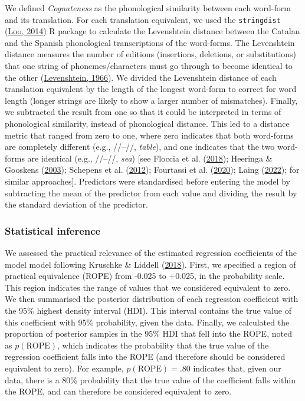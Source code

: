 \documentclass[
]{article}
\begin{document}
We defined \emph{Cognateness} as the phonological similarity between
each word-form and its translation. For each translation equivalent, we
used the \texttt{stringdist}
(\protect\hyperlink{ref-vanderloo2014stringdist}{Loo, 2014}) R package
to calculate the Levenshtein distance between the Catalan and the
Spanish phonological transcriptions of the word-forms. The Levenshtein
distance measures the number of editions (insertions, deletions, or
substitutions) that one string of phonemes/characters must go through to
become identical to the other
(\protect\hyperlink{ref-levenshtein1966binary}{Levenshtein, 1966}). We
divided the Levenshtein distance of each translation equivalent by the
length of the longest word-form to correct for word length (longer
strings are likely to show a larger number of mismatches). Finally, we
subtracted the result from one so that it could be interpreted in terms
of phonological similarity, instead of phonological distance. This led
to a distance metric that ranged from zero to one, where zero indicates
that both word-forms are completely different (e.g.,
//--//, \emph{table}), and one
indicates that the two word-forms are identical (e.g.,
//--//, \emph{sea}) {[}see Floccia et al.
(\protect\hyperlink{ref-floccia2018introduction}{2018}); Heeringa \&
Gooskens (\protect\hyperlink{ref-heeringa2003norwegian}{2003}); Schepens
et al. (\protect\hyperlink{ref-schepens2012distributions}{2012});
Fourtassi et al. (\protect\hyperlink{ref-fourtassi2020growth}{2020});
Laing (\protect\hyperlink{ref-laing2022phonological}{2022}); for similar
approaches{]}. Predictors were standardised before entering the model by
subtracting the mean of the predictor from each value and dividing the
result by the standard deviation of the predictor.

\hypertarget{statistical-inference}{%
\subsubsection{Statistical inference}\label{statistical-inference}}

We assessed the practical relevance of the estimated regression
coefficients of the model model following Kruschke \& Liddell
(\protect\hyperlink{ref-kruschke2018bayesian}{2018}). First, we
specified a region of practical equivalence (ROPE) from -0.025 to
+0.025, in the probability scale. This region indicates the range of
values that we considered equivalent to zero. We then summarised the
posterior distribution of each regression coefficient with the 95\%
highest density interval (HDI). This interval contains the true value of
this coefficient with 95\% probability, given the data. Finally, we
calculated the proportion of posterior samples in the 95\% HDI that fell
into the ROPE, noted as \(p(\text{ROPE})\), which indicates the
probability that the true value of the regression coefficient falls into
the ROPE (and therefore should be considered equivalent to zero). For
example, \(p(\text{ROPE})=.80\) indicates that, given our data, there is
a 80\% probability that the true value of the coefficient falls within
the ROPE, and can therefore be considered equivalent to zero.
\end{document}
